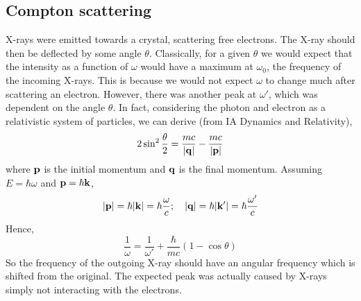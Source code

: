 \subsection{Compton scattering}
X-rays were emitted towards a crystal, scattering free electrons.
The X-ray should then be deflected by some angle \( \theta \).
Classically, for a given \( \theta \) we would expect that the intensity as a function of \( \omega \) would have a maximum at \( \omega_0 \), the frequency of the incoming X-rays.
This is because we would not expect \( \omega \) to change much after scattering an electron.
However, there was another peak at \( \omega' \), which was dependent on the angle \( \theta \).
In fact, considering the photon and electron as a relativistic system of particles, we can derive (from IA Dynamics and Relativity),
\[
	2 \sin^2 \frac{\theta}{2} = \frac{mc}{\abs{\vb q}} - \frac{mc}{\abs{\vb p}}
\]
where \( \vb p \) is the initial momentum and \( \vb q \) is the final momentum.
Assuming \( E = \hbar \omega \) and \( \vb p = \hbar \vb k \),
\[
	\abs{\vb p} = \hbar \abs{\vb k} = \hbar \frac{\omega}{c};\quad \abs{\vb q} = \hbar \abs{\vb k'} = \hbar\frac{\omega'}{c}
\]
Hence,
\[
	\frac{1}{\omega} = \frac{1}{\omega'} + \frac{\hbar}{mc}(1-\cos\theta)
\]
So the frequency of the outgoing X-ray should have an angular frequency which is shifted from the original.
The expected peak was actually caused by X-rays simply not interacting with the electrons.

